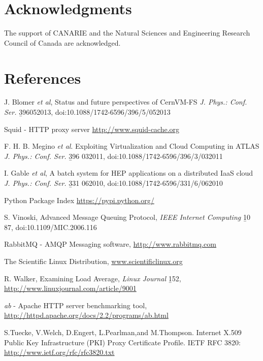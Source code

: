 \documentclass[a4paper]{jpconf}
\begin{document}
\section{ Acknowledgments }
The support of CANARIE and the Natural Sciences and Engineering Research Council of 
Canada are acknowledged.


\section*{References}
\begin{thebibliography}{10}

J. Blomer {\it et al}, 
Status and future perspectives of CernVM-FS
{\it J. Phys.: Conf. Ser.}  {\b 396}052013, 
doi:10.1088/1742-6596/396/5/052013

Squid - HTTP proxy server
\url{http://www.squid-cache.org}

F. H. B. Megino {\it et al}.
Exploiting Virtualization and Cloud Computing in ATLAS
{\it J. Phys.: Conf. Ser.} {\b 396} 032011, 
doi:10.1088/1742-6596/396/3/032011

I. Gable {\it et al},
A batch system for HEP applications on a distributed IaaS cloud 
{\it J. Phys.: Conf. Ser.} {\b 331} 062010,
doi:10.1088/1742-6596/331/6/062010

Python Package Index
\url{https://pypi.python.org/}

S. Vinoski,
Advanced Message Queuing Protocol,
{\it IEEE Internet Computing }{\b 10} 87,
doi:10.1109/MIC.2006.116

RabbitMQ - AMQP Messaging software,
\url{http://www.rabbitmq.com} 

The Scientific Linux Distribution,
\url{www.scientificlinux.org}

R. Walker, Examining Load Average,
{\it Linux Journal} {\b 152},
\url{http://www.linuxjournal.com/article/9001}

{\it ab } - Apache HTTP server benchmarking tool,
\url{http://httpd.apache.org/docs/2.2/programs/ab.html}

S.Tuecke, V.Welch, D.Engert, L.Pearlman,and M.Thompson.
Internet X.509 Public Key Infrastructure (PKI) Proxy Certificate Profile.
IETF RFC 3820: \url{http://www.ietf.org/rfc/rfc3820.txt}

\end{thebibliography}
\end{document}
